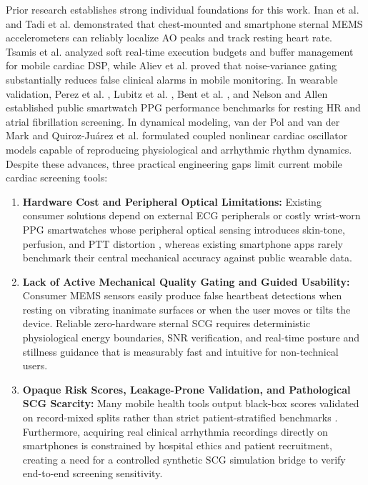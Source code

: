 Prior research establishes strong individual foundations for this work. Inan et al. \cite{inan2015ballistocardiography} and Tadi et al. \cite{tadi2016realtime} demonstrated that chest-mounted and smartphone sternal MEMS accelerometers can reliably localize AO peaks and track resting heart rate. Tsamis et al. \cite{tsamis2017soft} analyzed soft real-time execution budgets and buffer management for mobile cardiac DSP, while Aliev et al. \cite{aliev2012monitoring} proved that noise-variance gating substantially reduces false clinical alarms in mobile monitoring. In wearable validation, Perez et al. \cite{perez2019large}, Lubitz et al. \cite{lubitz2022detection}, Bent et al. \cite{bent2020investigating}, and Nelson and Allen \cite{nelson2019accuracy} established public smartwatch PPG performance benchmarks for resting HR and atrial fibrillation screening. In dynamical modeling, van der Pol and van der Mark \cite{vanderpol1928} and Quiroz-Ju{\'a}rez et al. \cite{quiroz2018cardiac} formulated coupled nonlinear cardiac oscillator models capable of reproducing physiological and arrhythmic rhythm dynamics. Despite these advances, three practical engineering gaps limit current mobile cardiac screening tools:
\begin{enumerate}
	\item \textbf{Hardware Cost and Peripheral Optical Limitations:} Existing consumer solutions depend on external ECG peripherals or costly wrist-worn PPG smartwatches whose peripheral optical sensing introduces skin-tone, perfusion, and PTT distortion \cite{bent2020investigating}, whereas existing smartphone apps rarely benchmark their central mechanical accuracy against public wearable data.
	\item \textbf{Lack of Active Mechanical Quality Gating and Guided Usability:} Consumer MEMS sensors easily produce false heartbeat detections when resting on vibrating inanimate surfaces or when the user moves or tilts the device. Reliable zero-hardware sternal SCG requires deterministic physiological energy boundaries, SNR verification, and real-time posture and stillness guidance that is measurably fast and intuitive for non-technical users.
	\item \textbf{Opaque Risk Scores, Leakage-Prone Validation, and Pathological SCG Scarcity:} Many mobile health tools output black-box scores validated on record-mixed splits rather than strict patient-stratified benchmarks \cite{dechazal2004automatic}. Furthermore, acquiring real clinical arrhythmia recordings directly on smartphones is constrained by hospital ethics and patient recruitment, creating a need for a controlled synthetic SCG simulation bridge to verify end-to-end screening sensitivity.
\end{enumerate}


